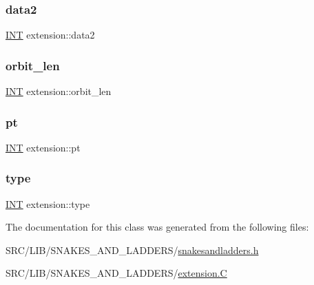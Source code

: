 \subsubsection{\texorpdfstring{data2}{data2}}
{\footnotesize\ttfamily \mbox{\hyperlink{galois_8h_a09fddde158a3a20bd2dcadb609de11dc}{I\+NT}} extension\+::data2}

\mbox{\label{classextension_a5fa9bb2d2cd4736b29e44bb88fd033be}} 
\subsubsection{\texorpdfstring{orbit\+\_\+len}{orbit\_len}}
{\footnotesize\ttfamily \mbox{\hyperlink{galois_8h_a09fddde158a3a20bd2dcadb609de11dc}{I\+NT}} extension\+::orbit\+\_\+len}

\mbox{\label{classextension_a20a30d16559a92a220238402941ba237}} 
\subsubsection{\texorpdfstring{pt}{pt}}
{\footnotesize\ttfamily \mbox{\hyperlink{galois_8h_a09fddde158a3a20bd2dcadb609de11dc}{I\+NT}} extension\+::pt}

\mbox{\label{classextension_ae1e5ae14fb1b3c5743e788edcad2879a}} 
\subsubsection{\texorpdfstring{type}{type}}
{\footnotesize\ttfamily \mbox{\hyperlink{galois_8h_a09fddde158a3a20bd2dcadb609de11dc}{I\+NT}} extension\+::type}



The documentation for this class was generated from the following files\+:\begin{DoxyCompactItemize}
\item 
S\+R\+C/\+L\+I\+B/\+S\+N\+A\+K\+E\+S\+\_\+\+A\+N\+D\+\_\+\+L\+A\+D\+D\+E\+R\+S/\mbox{\hyperlink{snakesandladders_8h}{snakesandladders.\+h}}\item 
S\+R\+C/\+L\+I\+B/\+S\+N\+A\+K\+E\+S\+\_\+\+A\+N\+D\+\_\+\+L\+A\+D\+D\+E\+R\+S/\mbox{\hyperlink{extension_8_c}{extension.\+C}}\end{DoxyCompactItemize}
